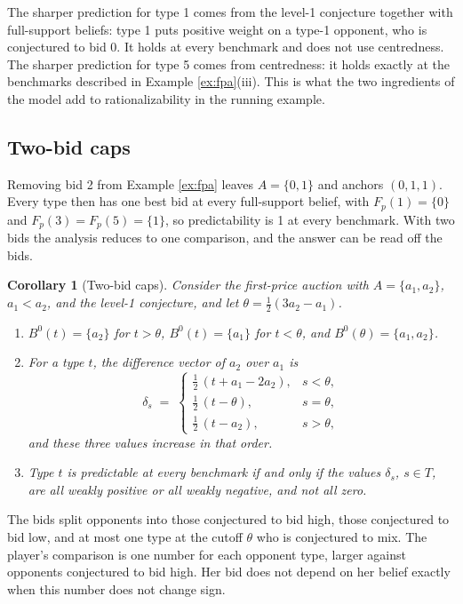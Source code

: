 \documentclass[12pt]{article}
\newtheorem{corollary}{Corollary}
\theoremstyle{definition}
\begin{document}
The sharper prediction for type 1 comes from the level-1 conjecture together with full-support beliefs: type 1 puts positive weight on a type-1 opponent, who is conjectured to bid 0. It holds at every benchmark and does not use centredness. The sharper prediction for type 5 comes from centredness: it holds exactly at the benchmarks described in Example \ref{ex:fpa}(iii). This is what the two ingredients of the model add to rationalizability in the running example.

\subsection{Two-bid caps}\label{sec:caps}

Removing bid 2 from Example \ref{ex:fpa} leaves $A = \{0, 1\}$ and anchors $(0, 1, 1)$. Every type then has one best bid at every full-support belief, with $F_p(1) = \{0\}$ and $F_p(3) = F_p(5) = \{1\}$, so predictability is 1 at every benchmark. With two bids the analysis reduces to one comparison, and the answer can be read off the bids.

\begin{corollary}[Two-bid caps]\label{prop:cap}
Consider the first-price auction with $A = \{a_1, a_2\}$, $a_1 < a_2$, and the level-1 conjecture, and let $\theta = \tfrac{1}{2}(3 a_2 - a_1)$.
\begin{enumerate}
\item[(i)] $B^0(t) = \{a_2\}$ for $t > \theta$, $B^0(t) = \{a_1\}$ for $t < \theta$, and $B^0(\theta) = \{a_1, a_2\}$.
\item[(ii)] For a type $t$, the difference vector of $a_2$ over $a_1$ is
\[
\delta_s \;=\;
\begin{cases}
\tfrac12\,(t + a_1 - 2a_2), & s < \theta, \\[2pt]
\tfrac12\,(t - \theta),     & s = \theta, \\[2pt]
\tfrac12\,(t - a_2),        & s > \theta,
\end{cases}
\]
and these three values increase in that order.
\item[(iii)] Type $t$ is predictable at every benchmark if and only if the values $\delta_s$, $s \in T$, are all weakly positive or all weakly negative, and not all zero.
\end{enumerate}
\end{corollary}

The bids split opponents into those conjectured to bid high, those conjectured to bid low, and at most one type at the cutoff $\theta$ who is conjectured to mix. The player's comparison is one number for each opponent type, larger against opponents conjectured to bid high. Her bid does not depend on her belief exactly when this number does not change sign.
\end{document}
